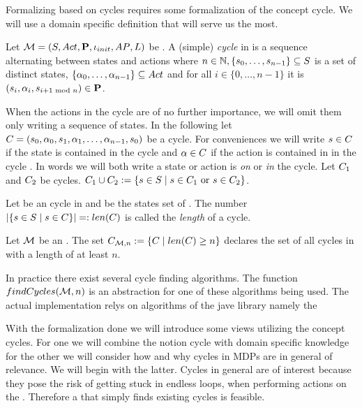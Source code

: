 \documentclass[preview]{standalone}
\begin{document}
Formalizing \viewsN based on cycles requires some formalization of the concept cycle. We will use a domain specific definition that will serve us the most.

\begin{definition}
	Let ${{{\mathcal{M}}}} = {{({S}, {Act}, {\textbf{P}}, {\iota_{init}}, {AP}, {L})}}$ be \achgphN. A (simple) \emph{cycle} \cycle in \chgph is a sequence \cyclesecfull alternating between states and actions where $n \in {\mathbb{N}}, \{{s}_0, \dots, {s}_{n-1}\} \subseteq {S}$ is a set of distinct states,  $\{{\alpha}_0, \dots, {\alpha}_{n-1}\} \subseteq {Act}$ and for all $i \in \{0, \dots, n-1\}$ it is $({s}_i,{\alpha}_i, {s}_{i+1 \text{ mod }n}) \in {\ensuremath{{\textbf{P}}}}$.
\end{definition}

When the actions in the cycle are of no further importance, we will omit them only writing a sequence of states. In the following let ${C} = {({s}_0, {\alpha}_0, {s}_1, {\alpha}_1, \dots, {\alpha}_{n-1}, {s}_0)}$ be a cycle. For conveniences we will write ${s} \in {C}$ if the state is contained in the cycle \cycle and ${\alpha} \in {C}$ if the action is contained in in the cycle \cycle.  In words we will both write a state or action is \emph{on} or \emph{in} the cycle. Let ${C}_1$ and ${C}_2$ be cycles. ${C}_1 \cup {C}_2 := \{{s} \in {S} \mid {s} \in {C}_1 \text{ or } {s} \in {C}_2\}$.

\begin{definition}
	Let \cycle be an cycle in \chgph and \states be the states set of \chgph. The number $|\{{s} \in {S} \mid {s} \in {C}\}| =: {len}({C})$ is called the \emph{length} of a cycle. 
\end{definition}

\begin{definition}
	Let ${{{\mathcal{M}}}}$ be an \chgphN. The set ${{C}_{{{\mathcal{M}}}, n}} := \{ {C} \mid {len}({C}) \geq n\}$ declares the set of all cycles in \chgph with a length of at least $n$.
\end{definition}

In practice there exist several cycle finding algorithms. The function ${findCycles}({{{\mathcal{M}}}}, n)$ is an abstraction for one of these algorithms being used. The actual implementation relys on algorithms of the jave library \jgrapht namely the 

With the formalization done we will introduce some views utilizing the concept cycles. For one we will combine the notion cycle with domain specific knowledge for the other we will consider how and why cycles in MDPs are in general of relevance. We will begin with the latter.  Cycles in general are of interest because they pose the risk of getting stuck in endless loops, when performing actions on the \mdpN.  Therefore a \viewN that simply finds existing cycles is feasible.
\end{document}
